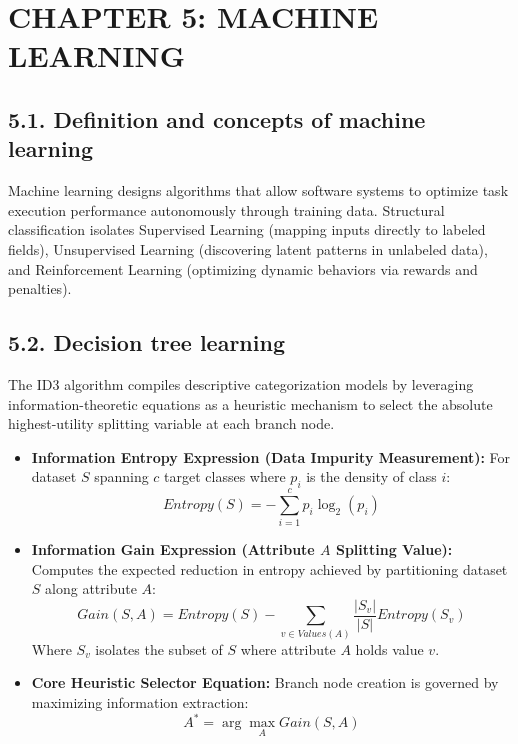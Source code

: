 \documentclass[11pt,a4paper]{article}
\begin{document}
\section{CHAPTER 5: MACHINE LEARNING}

\subsection{5.1. Definition and concepts of machine learning}
Machine learning designs algorithms that allow software systems to optimize task execution performance autonomously through training data. Structural classification isolates Supervised Learning (mapping inputs directly to labeled fields), Unsupervised Learning (discovering latent patterns in unlabeled data), and Reinforcement Learning (optimizing dynamic behaviors via rewards and penalties).

\subsection{5.2. Decision tree learning}
The ID3 algorithm compiles descriptive categorization models by leveraging information-theoretic equations as a heuristic mechanism to select the absolute highest-utility splitting variable at each branch node.
\begin{itemize}
    \item \textbf{Information Entropy Expression (Data Impurity Measurement):} For dataset $S$ spanning $c$ target classes where $p_i$ is the density of class $i$:
    \begin{equation}
        Entropy(S) = - \sum_{i=1}^{c} p_i \log_2(p_i)
    \end{equation}
    \item \textbf{Information Gain Expression (Attribute $A$ Splitting Value):} Computes the expected reduction in entropy achieved by partitioning dataset $S$ along attribute $A$:
    \begin{equation}
        Gain(S, A) = Entropy(S) - \sum_{v \in Values(A)} \frac{|S_v|}{|S|} Entropy(S_v)
    \end{equation}
    Where $S_v$ isolates the subset of $S$ where attribute $A$ holds value $v$.
    \item \textbf{Core Heuristic Selector Equation:} Branch node creation is governed by maximizing information extraction:
    \begin{equation}
        A^* = \arg\max_{A} Gain(S, A)
    \end{equation}
\end{itemize}
\end{document}
